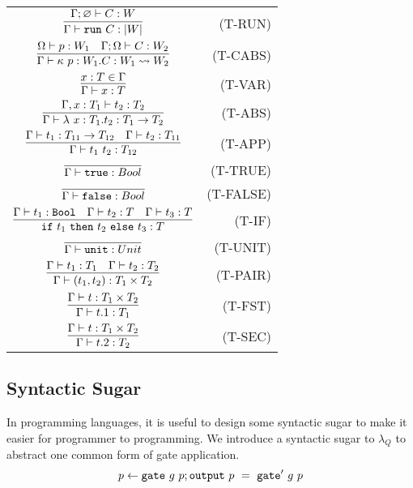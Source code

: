 \renewcommand\arraystretch{3}
\begin{longtable}[c]{cr}
  $\infer{\Gamma\vdash \trun\ C : |W| }{\Gamma;\varnothing \vdash C:W}$ &(T-RUN)\\
  $\infer{\Gamma\vdash \kappa\ p:W_1 . C: W_1\leadsto W_2 }{\Omega\vdash p:W_1 &\Gamma;\Omega\vdash C:W_2}$ &(T-CABS)\\
  $\infer{\Gamma\vdash x:T}{x:T\in \Gamma}$ &(T-VAR)\\
  $\infer{\Gamma\vdash \lambda\ x:T_1.t_2 : T_1\to T_2}{\Gamma,x:T_1 \vdash t_2:T_2}$ &(T-ABS)\\
  $\infer{\Gamma\vdash t_1\ t_2 : T_{12}}{\Gamma\vdash t_1:T_{11}\to T_{12} & \Gamma\vdash t_2:T_{11}}$ &(T-APP)\\
  $\infer{\Gamma\vdash\true : Bool}{}$ &(T-TRUE)\\
  $\infer{\Gamma\vdash\false : Bool}{}$ &(T-FALSE)\\
  $\infer{\tif\ t_1\ \tthen\ t_2\ \telse\ t_3 : T}{\Gamma\vdash t_1:\Bool &\Gamma\vdash t_2:T &\Gamma\vdash t_3:T}$ &(T-IF)\\
  $\infer{\Gamma\vdash\unit : Unit}{}$ &(T-UNIT)\\
  $\infer{\Gamma\vdash (t_1,t_2) : T_1\times T_2}{\Gamma\vdash t_1:T_1 &\Gamma\vdash t_2:T_2}$ &(T-PAIR)\\
  $\infer{\Gamma\vdash t.1 : T_1}{\Gamma\vdash t : T_1\times T_2}$ &(T-FST)\\
  $\infer{\Gamma\vdash t.2 : T_2}{\Gamma\vdash t : T_1\times T_2}$ &(T-SEC)\\
\end{longtable}


\subsection{Syntactic Sugar}
In programming languages, it is useful to design some syntactic sugar to make it easier for programmer to programming.
We introduce a syntactic sugar to $\lambda_Q$ to abstract one common form of gate application.
$$p \from \gate\ g\ p;\toutput\ p \ =\ \gate'\ g\ p$$